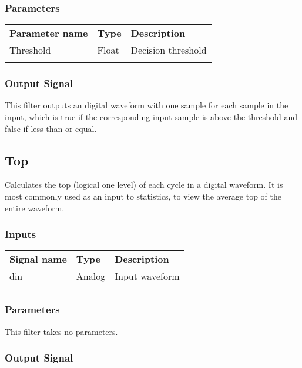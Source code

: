 \subsubsection{Parameters}

\begin{tabularx}{16cm}{llX}
\thickhline
\textbf{Parameter name} & \textbf{Type} & \textbf{Description} \\
\thickhline
Threshold & Float & Decision threshold \\
\thickhline
\end{tabularx}

\subsubsection{Output Signal}

This filter outputs an digital waveform with one sample for each sample in the input, which is true if the
corresponding input sample is above the threshold and false if less than or equal.

\pagebreak
\subsection{Top}

Calculates the top (logical one level) of each cycle in a digital waveform. It is most commonly used as an input to
statistics, to view the average top of the entire waveform.

\subsubsection{Inputs}

\begin{tabularx}{16cm}{llX}
\thickhline
\textbf{Signal name} & \textbf{Type} & \textbf{Description} \\
\thickhline
din & Analog & Input waveform \\
\thickhline
\end{tabularx}

\subsubsection{Parameters}

This filter takes no parameters.

\subsubsection{Output Signal}

